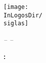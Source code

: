 \pagestyle{empty}

\begin{center}
    \vspace{3cm}
    \texttt{[image: \\InLogosDir/\\siglas]}\\
    \begin{huge}
        \underlogotext
    \end{huge}
    \vspace{3cm}

    \begin{huge}
        \doctitle
    \end{huge}
    \vspace{3cm}


    \begin{Large}
        \textit{-- \FinalReport --}
    \end{Large}
    \vspace{4cm}

    \begin{Large}
        \textbf{\LastModification: \fecha}
    \end{Large}
\end{center}

